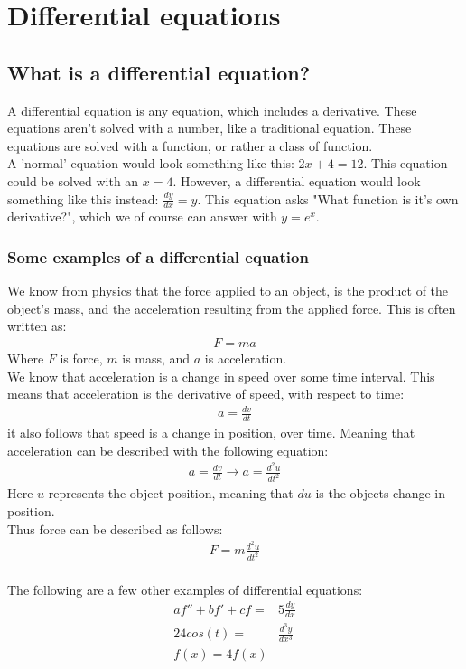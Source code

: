 \chapter{Differential equations}

\section{What is a differential equation?}
A differential equation is any equation, which includes a derivative. These equations aren't solved with a number, like a traditional equation. These equations are solved with a function, or rather a class of function. \\
A 'normal' equation would look something like this: $2x+4=12$. This equation could be solved with an $x=4$. However, a differential equation would look something like this instead: $\frac{dy}{dx} = y$. This equation asks "What function is it's own derivative?", which we of course can answer with $y=e^x$. \\

\subsection{Some examples of a differential equation}
We know from physics that the force applied to an object, is the product of the object's mass, and the acceleration resulting from the applied force. This is often written as: 
\begin{align*}
	F=ma
\end{align*}
Where $F$ is force, $m$ is mass, and $a$ is acceleration. \\
We know that acceleration is a change in speed over some time interval. This means that acceleration is the derivative of speed, with respect to time:
\begin{align}
	a = \frac{dv}{dt}
\end{align}
it also follows that speed is a change in position, over time. Meaning that acceleration can be described with the following equation:
\begin{align*}
	a = \frac{dv}{dt} \rightarrow a = \frac{d^2u}{dt^2}
\end{align*}
Here $u$ represents the object position, meaning that $du$ is the objects change in position. \\
Thus force can be described as follows:
\begin{align}
	 F = m\frac{d^2u}{dt^2}
\end{align}
\\
The following are a few other examples of differential equations:
\begin{align}
	af''+bf'+cf =& 5\frac{dy}{dx}		\\
	24cos(t)=&\frac{d^3y}{dx^3}			\\
	f(x)=4f(x) 						
\end{align}
